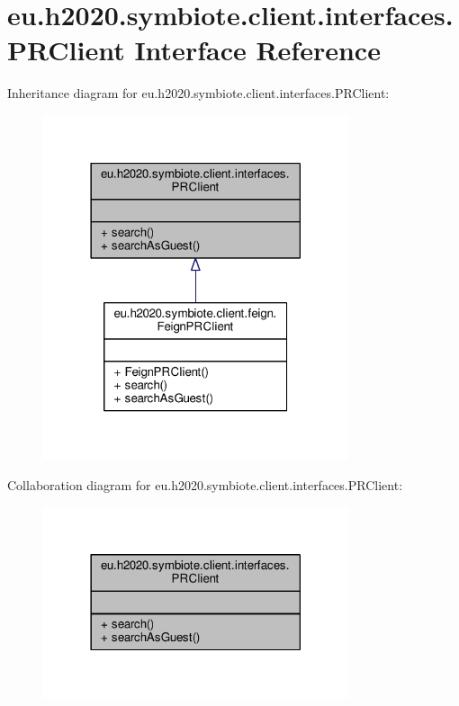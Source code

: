 \hypertarget{interfaceeu_1_1h2020_1_1symbiote_1_1client_1_1interfaces_1_1PRClient}{}\section{eu.\+h2020.\+symbiote.\+client.\+interfaces.\+P\+R\+Client Interface Reference}
\label{interfaceeu_1_1h2020_1_1symbiote_1_1client_1_1interfaces_1_1PRClient}


Inheritance diagram for eu.\+h2020.\+symbiote.\+client.\+interfaces.\+P\+R\+Client\+:\nopagebreak
\begin{figure}[H]
\begin{center}
\leavevmode
\includegraphics[width=254pt]{interfaceeu_1_1h2020_1_1symbiote_1_1client_1_1interfaces_1_1PRClient__inherit__graph}
\end{center}
\end{figure}


Collaboration diagram for eu.\+h2020.\+symbiote.\+client.\+interfaces.\+P\+R\+Client\+:\nopagebreak
\begin{figure}[H]
\begin{center}
\leavevmode
\includegraphics[width=254pt]{interfaceeu_1_1h2020_1_1symbiote_1_1client_1_1interfaces_1_1PRClient__coll__graph}
\end{center}
\end{figure}
